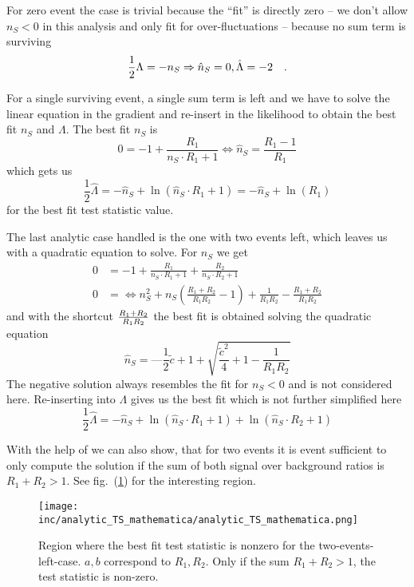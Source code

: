For zero event the case is trivial because the \enquote{fit} is directly zero -- we don't allow $n_S < 0$ in this analysis and only fit for over-fluctuations -- because no sum term is surviving
\begin{equation}
  \frac{1}{2}\Lambda = -n_S \Rightarrow \hat{n}_S
  = 0, \hat{\Lambda} = -2 \quad\text{.}
\end{equation}

For a single surviving event, a single sum term is left and we have to solve the linear equation in the gradient and re-insert in the likelihood to obtain the best fit $n_S$ and $\Lambda$.
The best fit $n_S$ is
\begin{equation}
  0 = -1 + \frac{R_1}{n_S\cdot R_1 + 1}
    \Leftrightarrow \hat{n}_S = \frac{R_1 - 1}{R_1}
\end{equation}
which gets us
\begin{equation}
  \frac{1}{2}\hat{\Lambda}
    = -\hat{n}_S + \ln\left( \hat{n}_S \cdot R_1 + 1 \right)
    = -\hat{n}_S + \ln(R_1)
\end{equation}
for the best fit test statistic value.

The last analytic case handled is the one with two events left, which leaves us with a quadratic equation to solve.
For $n_S$ we get
\begin{align}
  0 &= -1 + \frac{R_1}{n_S\cdot R_1 + 1} + \frac{R_2}{n_S\cdot R_2 + 1} \\
  0 &= \Leftrightarrow n_S^2 + n_S \left(\frac{R_1 + R_2}{R_1 R_2} - 1\right) +
       \frac{1}{R_1 R_2} - \frac{R_1 + R_2}{R_1 R_2}
\end{align}
and with the shortcut $\frac{R_1 + R_2}{R_1 R_2} \def \tilde{c}$ the best fit is obtained solving the quadratic equation
\begin{equation}
  \hat{n}_S = —\frac{1}{2}\tilde{c} + 1 + \sqrt{\frac{\tilde{c}^2}{4} + 1 - \frac{1}{R_1 R_2}}
\end{equation}
The negative solution always resembles the fit for $n_S < 0$ and is not considered here.
Re-inserting into $\Lambda$ gives us the best fit which is not further simplified here
\begin{equation}
  \frac{1}{2}\hat{\Lambda} = -\hat{n}_S +
                             \ln\left( \hat{n}_S \cdot R_1 + 1 \right) +
                             \ln\left( \hat{n}_S \cdot R_2 + 1 \right)
\end{equation}

With the help of  we can also show, that for two events it is event sufficient to only compute the solution if the sum of both signal over background ratios is $R_1 + R_2 > 1$.
See fig.~(\ref{fig:mathematica_ts}) for the interesting region.
\begin{figure}[h]
  \centering
  \texttt{[image: inc/analytic\_TS\_mathematica/analytic\_TS\_mathematica.png]}
  \caption{Region where the best fit test statistic is nonzero for the two-events-left-case. $a, b$ correspond to $R_1, R_2$. Only if the sum $R_1 + R_2 > 1$, the test statistic is non-zero.}
  \label{fig:mathematica_ts}
\end{figure}



